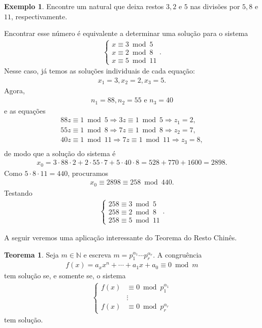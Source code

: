 \documentclass[a4paper,11pt,twoside, leqno]{article}
\theoremstyle{definition}
\newtheorem{theorem}{Teorema}[section]
\newtheorem*{example}{Exemplo}
\begin{document}
\begin{example}
	Encontre um natural que deixa restos $3,2$ e $5$ nas divisões por $5, 8$ e $11$, respectivamente.
	\par\vspace{0.3cm} Encontrar esse número é equivalente a determinar uma solução para o sistema
	\begin{align*}
	\begin{cases}
	x\equiv 3\bmod 5 \\
	x\equiv 2\bmod 8 \\
	x\equiv 5\bmod 11
	\end{cases}.
	\end{align*}
	Nesse caso, já temos as soluções individuais de cada equação:
	\begin{align*}
	x_1 = 3, x_2 = 2, x_3 = 5.
	\end{align*}
	Agora, 
	\begin{align*}
	n_1 = 88, n_2 = 55 \text{ e } n_3 = 40
	\end{align*}
	e as equações
	\begin{align*}
	88z\equiv 1\bmod 5 \Rightarrow 3z\equiv 1\bmod 5 \Rightarrow z_1 = 2, \\
	55z\equiv 1\bmod 8 \Rightarrow 7z\equiv 1\bmod 8 \Rightarrow z_2 = 7, \\
	40z\equiv 1\bmod 11 \Rightarrow 7z\equiv 1\bmod 11 \Rightarrow z_3 = 8, \\
	\end{align*}
	de modo que a solução do sistema é
	\begin{align*}
	x_0 = 3\cdot 88\cdot 2 + 2\cdot 55\cdot 7 + 5\cdot 40\cdot 8 = 528 + 770 + 1600 = 2898.
	\end{align*}
	Como $5\cdot 8\cdot 11 = 440$, procuramos
	\begin{align*}
	x_0\equiv 2898\equiv 258\bmod 440.
	\end{align*}
	Testando
	\begin{align*}
	\begin{cases}
	258\equiv 3\bmod 5 \\
	258\equiv 2\bmod 8 \\
	258\equiv 5\bmod 11
	\end{cases}.
	\end{align*}
\end{example}
A seguir veremos uma aplicação interessante do Teorema do Resto Chinês.
\begin{theorem}
	Seja $m\in\mathbb{N}$ e escreva $m = p_1^{\alpha_1}\cdots p_r^{\alpha_r}$. A congruência 
	\begin{align*}
	f(x) = a_xx^n + \cdots + a_1x + a_0 \equiv 0\bmod m
	\end{align*} 
	tem solução se, e somente se, o sistema
	\begin{align*}
	\begin{cases}
	f(x) &\equiv 0\bmod p_1^{\alpha_1} \\
	&\vdots \\
	f(x) &\equiv 0\bmod p_r^{\alpha_r}
	\end{cases}
	\end{align*}
	tem solução.
\end{theorem}
\end{document}
